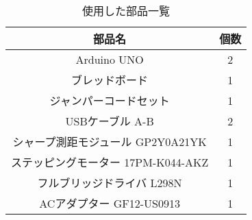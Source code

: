 \documentclass{jsarticle}
\begin{document}
\begin{table}[htbp]
 \caption{使用した部品一覧}
 \begin{center}
 \begin{tabular}{|c|c|}\hline
  部品名 & 個数\\\hline\hline
  Arduino UNO & 2\\\hline
  ブレッドボード & 1\\\hline
  ジャンパーコードセット & 1\\\hline
  USBケーブル A-B & 2\\\hline
  シャープ測距モジュール GP2Y0A21YK & 1\\\hline
  ステッピングモーター 17PM-K044-AKZ & 1\\\hline
  フルブリッジドライバ L298N & 1\\\hline
  ACアダプター GF12-US0913 & 1\\\hline
 \end{tabular}
 \end{center}
\end{table}
\end{document}
